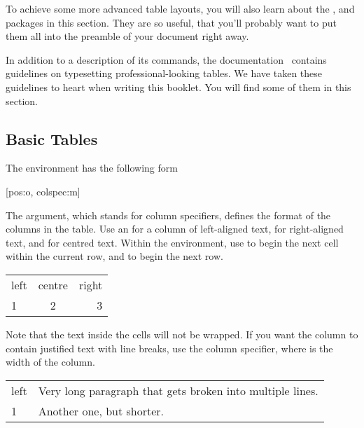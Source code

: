 To achieve some more advanced table layouts, you will also learn about the
,  and  packages in this section.
They are so useful, that you'll probably want to put them all into the preamble
of your document right away.

In addition to a description of its commands, the 
documentation~\cite{pack:booktabs} contains guidelines on typesetting
professional-looking tables. We have taken these guidelines to heart when
writing this booklet. You will find some of them in this section.

\subsection{Basic Tables}

The environment  has the following form
\begin{lscommand}
  [pos:o, colspec:m]
\end{lscommand} %
The  argument, which stands for column specifiers, defines the
format of the columns in the table. Use an  for a column of
left-aligned text,  for right-aligned text, and  for centred
text. Within the environment, use \ai{\&} to begin the next cell within the
current row, and \csi{\bs} to begin the next row.
\begin{example}
\begin{tabular}{lcr}
  left & centre & right \\
  1    & 2      & 3     \\
\end{tabular}
\end{example}
Note that the text inside the cells will not be wrapped. If you want the column
to contain justified text with line breaks, use the 
column specifier, where  is the width of the column.
\begin{example}
\begin{tabular}{lp{3cm}}
  left & Very long paragraph
         that gets broken into
         multiple lines. \\
  1    & Another one,
         but shorter. \\
\end{tabular}
\end{example}


